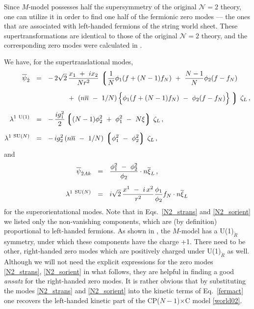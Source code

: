 \documentclass[12pt]{article}
\newcommand{\ntwo}{${\mathcal N}=2$ }
\newcommand{\wt}{\widetilde}
\newcommand{\ov}{\overline}
\newcommand{\lgr}{\left\lgroup}
\newcommand{\rgr}{\right\rgroup}
\newcommand{\nbar}{\ov{n}}
\newcommand{\CPC}{CP($N-1$)$\times$C }
\begin{document}
	Since $M$-model possesses half the supersymmetry of the original \ntwo theory, one can utilize
	it in order to find one half of the fermionic zero modes --- the ones that are associated 
	with left-handed fermions of the string world sheet.
	These supertransformations are identical to those of the original \ntwo theory, and the corresponding
	zero modes were calculated in \cite{BSYhet}.

	We have, for the supertranslational modes,
\begin{align}
\label{N2_strans}
%
\notag
\ov{\psi}_{\dot{2}}	& ~~=~~  -\,  2\sqrt{2}\, \frac{x_1 ~+~ i x_2}{N r^2} \,
		\lgr \frac{1}{N} \phi_1 ( f + (N-1) f_N ) ~+~ \frac{N-1}{N} \phi_2 ( f - f_N )  \right.
		\\[2mm]
%
\notag
%
			& \phantom{~~=~~  -\,  2\sqrt{2}}
			~+~ \left( n\nbar ~-~ 1/N \right )
			\Bigl\{ \phi_1 ( f + ( N-1 ) f_N ) ~-~ \phi_2 ( f - f_N) \Bigr\}
		\left. \rgr\, \zeta_L \,,
		\\[2mm]
%
\lambda^{1\ \rm U(1)} 	& ~~=~~ -\, \frac{i g_1^2}{2} \lgr (N-1)\phi_2^2  ~+~ \phi_1^2 ~-~ N\xi \rgr \, \zeta_L \,,
		\\[2mm]
%
\notag
\lambda^{1\ \text{SU($N$)}}	& ~~=~~ -\, {i g_2^2}\, ( n\nbar ~-~ 1/N )\, \lgr \phi_1^2 ~-~ \phi_2^2 \rgr\, \zeta_L\,,
\end{align}
	and 
\begin{align}
\label{N2_sorient}
%
\notag
\overline{\psi}_{\dot{2}Ak} & ~~=~~ \frac{\phi_1^2 ~-~ \phi_2^2}{\phi_2} \cdot n \overline{\xi}_L  \,,
 \\[2mm]
%
\lambda^{1\ \text{SU($N$)}} & ~~=~~ i \sqrt{2}\, \frac{ x^1 ~-~ i\, x^2 }{r^2} 
						  \frac{\phi_1}{\phi_2} f_N \cdot n \overline{\xi}_L \,
\end{align}
	for the superorientational modes. 
	Note that in Eqs.~\eqref{N2_strans} and \eqref{N2_sorient} we listed only the non-vanishing 
	components, which are (by definition) proportional to left-handed fermions. 
	As shown in \cite{GSYmmodel}, the $M$-model has a U(1)$_{\wt R}$ symmetry, under which these components
	have the charge +1. 
	There need to be other, right-handed zero modes which are positively charged 
	under U(1)$_{\wt R}$ as well.
	Although we will not need the explicit expressions for the 
	zero modes \eqref{N2_strans}, \eqref{N2_sorient} in what follows,
	they are helpful in finding a good {\it ansatz} for the right-handed zero modes.
	It is rather obvious that by substituting the modes \eqref{N2_strans} and \eqref{N2_sorient}
	into the kinetic terms of Eq.~\eqref{fermact} one recovers the left-handed kinetic part of the 
	\CPC model \eqref{world02}.
\end{document}
